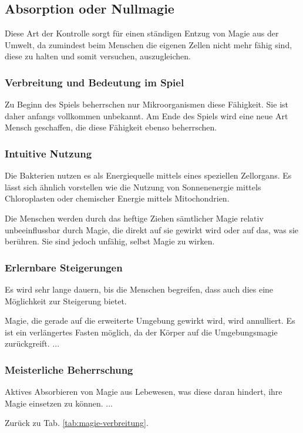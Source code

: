 \subsection{Absorption oder Nullmagie}\label{magie:absorption}
Diese Art der Kontrolle sorgt für einen ständigen Entzug von Magie aus der Umwelt, da zumindest beim Menschen die eigenen Zellen nicht mehr fähig sind, diese zu halten und somit versuchen, auszugleichen. 

\subsubsection{Verbreitung und Bedeutung im Spiel}
Zu Beginn des Spiels beherrschen nur Mikroorganismen diese Fähigkeit. Sie ist daher anfangs vollkommen unbekannt. 
Am Ende des Spiels wird eine neue Art Mensch geschaffen, die diese Fähigkeit ebenso beherrschen.

\subsubsection{Intuitive Nutzung}
Die Bakterien nutzen es als Energiequelle mittels eines speziellen Zellorgans. 
Es lässt sich ähnlich vorstellen wie die Nutzung von Sonnenenergie mittels Chloroplasten oder chemischer Energie mittels Mitochondrien. 

Die Menschen werden durch das heftige Ziehen sämtlicher Magie relativ unbeeinflussbar durch Magie, die direkt auf sie gewirkt wird oder auf das, was sie berühren. 
Sie sind jedoch unfähig, selbst Magie zu wirken.

\subsubsection{Erlernbare Steigerungen}
Es wird sehr lange dauern, bis die Menschen begreifen, dass auch dies eine Möglichkeit zur Steigerung bietet.
\begin{outline}
	\1 Magie, die gerade auf die erweiterte Umgebung gewirkt wird, wird annulliert.
	\1 Es ist ein verlängertes Fasten möglich, da der Körper auf die Umgebungsmagie zurückgreift.
	\1 ...
\end{outline}

\subsubsection{Meisterliche Beherrschung} 
\begin{outline}
	\1 Aktives Absorbieren von Magie aus Lebewesen, was diese daran hindert, ihre Magie einsetzen zu können.
	\1 ...
\end{outline}
Zurück zu Tab. \ref{tab:magie-verbreitung}.



